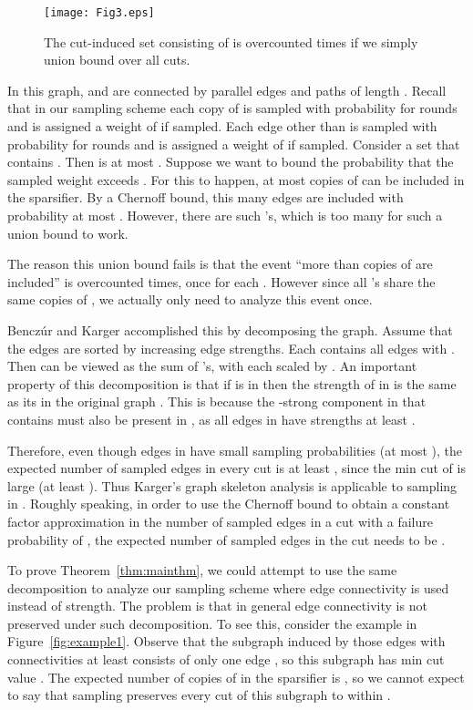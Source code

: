 \documentclass[11pt]{article}
\numberwithin{equation}{section}
\newcommand{\FigureName}[1]{\label{fig:#1}}
\newcommand{\Figure}[1]{Figure~\ref{fig:#1}}
\newcommand{\Theorem}[1]{Theorem~\ref{thm:#1}}
\begin{document}
\begin{figure}
	\centering
    \texttt{[image: Fig3.eps]}
	\caption{The cut-induced set consisting of  is overcounted  times if we simply union
    bound over all cuts.}
	\FigureName{example3}
\end{figure}

In this graph,  and  are connected by  parallel edges
and  paths of length .
Recall that in our sampling scheme 
each copy of  is sampled with probability 
for  rounds and is assigned a weight of  if sampled.
Each edge other than  is sampled with probability 
for  rounds and is assigned a weight of  if sampled.
Consider a set  that contains .
Then  is at most .
Suppose we want to bound the probability that
the sampled weight  exceeds .
For this to happen, at most  copies of 
can be included in the sparsifier.
By a Chernoff bound, this many edges are included 
with probability at most .
However, there are  such 's,
which is too many for such a union bound to work.

The reason this union bound fails
is that the event ``more than  copies of  are included''
is overcounted  times, once for each .
However since all 's share the same  copies of ,
we actually only need to analyze this event once.

Bencz\'ur and Karger \cite{BK} accomplished this by decomposing the graph.
Assume that the edges  are sorted by increasing edge strengths.
Each  contains all edges  with .
Then  can be viewed as the sum of 's,
with each  scaled by .
An important property of this decomposition is that
if  is in  
then the strength of  in  is the same as
its in the original graph . 
This is because the -strong component  in  that contains 
must also be present in , as all edges in  have strengths at least .

Therefore, even though edges in 
have small sampling probabilities (at most ), 
the expected number of sampled edges in every cut is 
at least ,
since the min cut of  is large (at least ).
Thus Karger's graph skeleton analysis is applicable to sampling in .
Roughly speaking, in order to use the Chernoff bound 
to obtain a constant factor approximation
in the number of sampled edges in a cut
with a failure probability of ,
the expected number of sampled edges in the cut needs to be .

To prove \Theorem{mainthm}, we could attempt to use the same decomposition to 
analyze our sampling scheme where edge connectivity is used instead of strength.
The problem is that in general
edge connectivity is not preserved under such decomposition.
To see this, consider the example in \Figure{example1}.
Observe that the subgraph induced by those edges 
with connectivities at least  
consists of only one edge , so this subgraph has min cut value .
The expected number of copies of  in the sparsifier is ,
so we cannot expect to say that sampling preserves every cut of this subgraph
to within .
\end{document}
